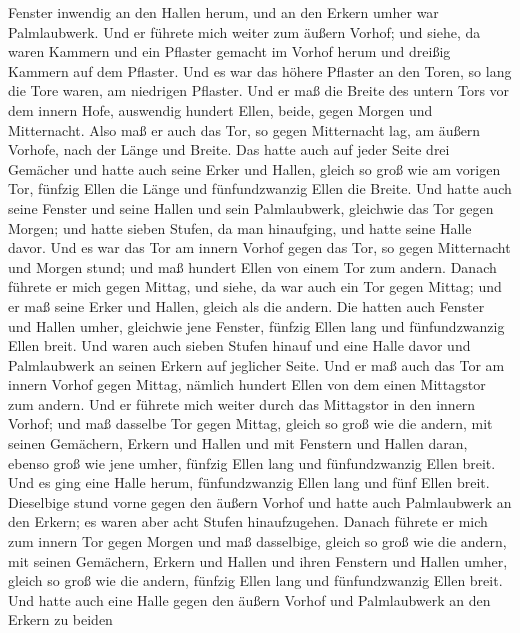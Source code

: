 Fenster inwendig an den Hallen herum, und an den Erkern umher war
Palmlaubwerk.  Und er führete mich weiter zum äußern
Vorhof; und siehe, da waren Kammern und ein Pflaster gemacht im Vorhof
herum und dreißig Kammern auf dem Pflaster.  Und es war das
höhere Pflaster an den Toren, so lang die Tore waren, am niedrigen
Pflaster.  Und er maß die Breite des untern Tors vor dem
innern Hofe, auswendig hundert Ellen, beide, gegen Morgen und
Mitternacht.  Also maß er auch das Tor, so gegen
Mitternacht lag, am äußern Vorhofe, nach der Länge und Breite.
 Das hatte auch auf jeder Seite drei Gemächer und hatte
auch seine Erker und Hallen, gleich so groß wie am vorigen Tor, fünfzig
Ellen die Länge und fünfundzwanzig Ellen die Breite.  Und
hatte auch seine Fenster und seine Hallen und sein Palmlaubwerk,
gleichwie das Tor gegen Morgen; und hatte sieben Stufen, da man
hinaufging, und hatte seine Halle davor.  Und es war das
Tor am innern Vorhof gegen das Tor, so gegen Mitternacht und Morgen
stund; und maß hundert Ellen von einem Tor zum andern. 
Danach führete er mich gegen Mittag, und siehe, da war auch ein Tor
gegen Mittag; und er maß seine Erker und Hallen, gleich als die andern.
 Die hatten auch Fenster und Hallen umher, gleichwie jene
Fenster, fünfzig Ellen lang und fünfundzwanzig Ellen breit.
 Und waren auch sieben Stufen hinauf und eine Halle davor
und Palmlaubwerk an seinen Erkern auf jeglicher Seite.  Und
er maß auch das Tor am innern Vorhof gegen Mittag, nämlich hundert Ellen
von dem einen Mittagstor zum andern.  Und er führete mich
weiter durch das Mittagstor in den innern Vorhof; und maß dasselbe Tor
gegen Mittag, gleich so groß wie die andern,  mit seinen
Gemächern, Erkern und Hallen und mit Fenstern und Hallen daran, ebenso
groß wie jene umher, fünfzig Ellen lang und fünfundzwanzig Ellen breit.
 Und es ging eine Halle herum, fünfundzwanzig Ellen lang
und fünf Ellen breit.  Dieselbige stund vorne gegen den
äußern Vorhof und hatte auch Palmlaubwerk an den Erkern; es waren aber
acht Stufen hinaufzugehen.  Danach führete er mich zum
innern Tor gegen Morgen und maß dasselbige, gleich so groß wie die
andern,  mit seinen Gemächern, Erkern und Hallen und ihren
Fenstern und Hallen umher, gleich so groß wie die andern, fünfzig Ellen
lang und fünfundzwanzig Ellen breit.  Und hatte auch eine
Halle gegen den äußern Vorhof und Palmlaubwerk an den Erkern zu beiden
